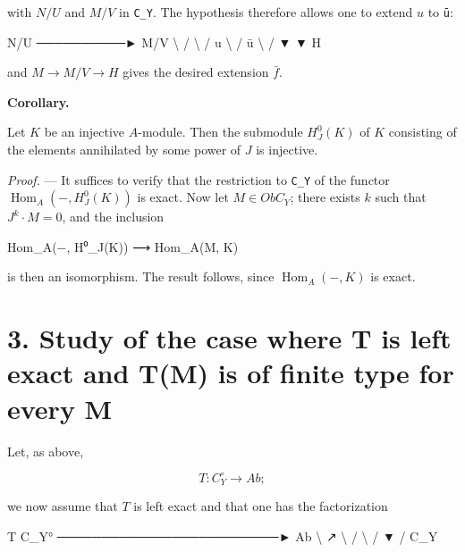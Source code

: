 \documentclass[
  11pt,
  a4paper,
]{book}
\newenvironment{Shaded}{}{}
\newcommand{\NormalTok}[1]{#1}
\begin{document}
with \(N/U\) and \(M/V\) in \texttt{C\_Y}. The hypothesis therefore
allows one to extend \(u\) to \texttt{ū}:

\begin{Shaded}
\begin{Highlighting}[]
\NormalTok{N/U ──────────► M/V}
\NormalTok{   \textbackslash{}           /}
\NormalTok{    \textbackslash{}         /}
\NormalTok{   u \textbackslash{}       / ū}
\NormalTok{      \textbackslash{}     /}
\NormalTok{       ▼   ▼}
\NormalTok{         H}
\end{Highlighting}
\end{Shaded}

and \(M \to M/V \to H\) gives the desired extension \(\bar{f}\).

\textbf{Corollary.}

Let \(K\) be an injective \(A\)-module. Then the submodule
\(H^{0}_{J}(K)\) of \(K\) consisting of the elements annihilated by some
power of \(J\) is injective.

\emph{Proof.} --- It suffices to verify that the restriction to
\texttt{C\_Y} of the functor \(\operatorname{Hom}_{A}(-, H^{0}_{J}(K))\)
is exact. Now let \(M \in Ob C_{Y}\); there exists \(k\) such that
\(J^{k} \cdot M = 0\), and the inclusion

\begin{Shaded}
\begin{Highlighting}[]
\NormalTok{Hom\_A(−, H⁰\_J(K)) ⟶ Hom\_A(M, K)}
\end{Highlighting}
\end{Shaded}

is then an isomorphism. The result follows, since
\(\operatorname{Hom}_{A}(-, K)\) is exact.

\section{3. Study of the case where T is left exact and T(M) is of
finite type for every
M}\label{study-of-the-case-where-t-is-left-exact-and-tm-is-of-finite-type-for-every-m}

Let, as above,

\[ T : C^{\circ}_{Y} \longrightarrow Ab; \]

we now assume that \(T\) is left exact and that one has the
factorization

\begin{Shaded}
\begin{Highlighting}[]
\NormalTok{                         T}
\NormalTok{        C\_Y°  ─────────────────────────►  Ab}
\NormalTok{            \textbackslash{}                          ↗}
\NormalTok{             \textbackslash{}                       /}
\NormalTok{              \textbackslash{}                    /}
\NormalTok{               ▼                 /}
\NormalTok{                    C\_Y}
\end{Highlighting}
\end{Shaded}
\end{document}
